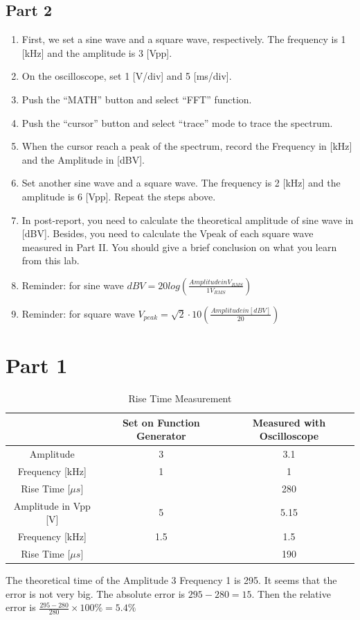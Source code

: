 \documentclass{article}
\begin{document}
\subsection{Part 2}
\begin{enumerate}
	\item First, we set a sine wave and a square wave, respectively. The frequency is 1
	[kHz] and the amplitude is 3 [Vpp].
	\item On the oscilloscope, set 1 [V/div] and 5 [ms/div].
	\item Push the “MATH” button and select “FFT” function.
	\item Push the “cursor” button and select “trace” mode to trace the spectrum.
	\item When the cursor reach a peak of the spectrum, record the Frequency in [kHz]
	and the Amplitude in [dBV].
	\item Set another sine wave and a square wave. The frequency is 2 [kHz] and the
	amplitude is 6 [Vpp]. Repeat the steps above.
	\item In post-report, you need to calculate the theoretical amplitude of sine wave in
	[dBV]. Besides, you need to calculate the Vpeak of each square wave
	measured in Part II. You should give a brief conclusion on what you learn
	from this lab.
	\item Reminder: for sine wave $dBV=20log(\frac{AmplitudeinV_{RMS}}{1V_{RMS}})$
	\item Reminder: for square wave $V_{peak}=\sqrt{2}\cdot 10(\frac{Amplitude in [dBV]}{20})$
\end{enumerate}
\section{Part 1}
\begin{table}[H]
	\centering
\begin{tabular}{|c|c|c|}
	\hline 
	& Set on Function Generator & Measured with Oscilloscope \\ 
	\hline 
	Amplitude& 3 & 3.1 \\ 
	\hline 
	Frequency [kHz]& 1 & 1 \\ 
	\hline 
	Rise Time [$\mu s$]&  & 280 \\ 
	\hline 
	Amplitude in Vpp [V]& 5 & 5.15 \\ 
	\hline 
	Frequency [kHz]& 1.5 & 1.5 \\ 
	\hline 
	Rise Time [$\mu s$]&  & 190 \\ 
	\hline 
\end{tabular} 
\caption{Rise Time Measurement}
\end{table}
The theoretical time of the Amplitude 3 Frequency 1 is 295. It seems that the error is not very big. The absolute error is $295-280=15$. Then the relative error is $\frac{295-280}{280}\times 100\%=5.4\%$
\end{document}
